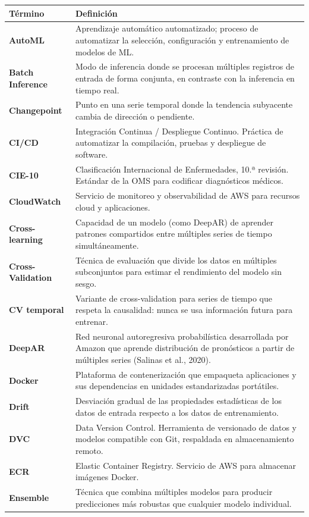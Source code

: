 \documentclass[12pt, letterpaper]{article}
\begin{document}
\begin{longtable}{>{\bfseries}l p{11cm}}
\toprule
\textbf{Término} & \textbf{Definición} \\
\midrule
\endhead
\bottomrule
\endfoot
AutoML & Aprendizaje automático automatizado; proceso de automatizar la selección, configuración y entrenamiento de modelos de ML. \\
Batch Inference & Modo de inferencia donde se procesan múltiples registros de entrada de forma conjunta, en contraste con la inferencia en tiempo real. \\
Changepoint & Punto en una serie temporal donde la tendencia subyacente cambia de dirección o pendiente. \\
CI/CD & Integración Continua / Despliegue Continuo. Práctica de automatizar la compilación, pruebas y despliegue de software. \\
CIE-10 & Clasificación Internacional de Enfermedades, 10.ª revisión. Estándar de la OMS para codificar diagnósticos médicos. \\
CloudWatch & Servicio de monitoreo y observabilidad de AWS para recursos cloud y aplicaciones. \\
Cross-learning & Capacidad de un modelo (como DeepAR) de aprender patrones compartidos entre múltiples series de tiempo simultáneamente. \\
Cross-Validation & Técnica de evaluación que divide los datos en múltiples subconjuntos para estimar el rendimiento del modelo sin sesgo. \\
CV temporal & Variante de cross-validation para series de tiempo que respeta la causalidad: nunca se usa información futura para entrenar. \\
DeepAR & Red neuronal autoregresiva probabilística desarrollada por Amazon que aprende distribución de pronósticos a partir de múltiples series (Salinas et al., 2020). \\
Docker & Plataforma de contenerización que empaqueta aplicaciones y sus dependencias en unidades estandarizadas portátiles. \\
Drift & Desviación gradual de las propiedades estadísticas de los datos de entrada respecto a los datos de entrenamiento. \\
DVC & Data Version Control. Herramienta de versionado de datos y modelos compatible con Git, respaldada en almacenamiento remoto. \\
ECR & Elastic Container Registry. Servicio de AWS para almacenar imágenes Docker. \\
Ensemble & Técnica que combina múltiples modelos para producir predicciones más robustas que cualquier modelo individual. \\

\end{longtable}
\end{document}
